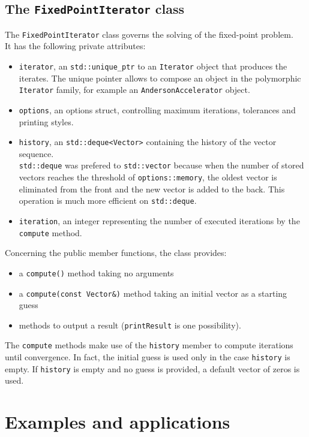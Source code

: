 \documentclass[12pt]{article}
\begin{document}
		
		\subsection {The \texttt{FixedPointIterator} class}
		The \texttt{FixedPointIterator} class governs the solving of the fixed-point problem.\\
		It has the following private attributes:
		\begin{itemize}
		\item \verb|iterator|, an \verb|std::unique_ptr| to an \verb|Iterator| object that produces the iterates. The unique pointer
		allows to compose an object in the polymorphic \verb|Iterator| family, for example an \verb|AndersonAccelerator| object.
		\item \verb|options|, an options struct, controlling maximum iterations, tolerances and printing styles.
		\item \verb|history|, an \verb|std::deque<Vector>| containing the history of the vector sequence.\\
		\verb|std::deque| was prefered to \verb|std::vector| because when the number of stored vectors reaches the threshold
		of \verb|options::memory|, the oldest vector is eliminated from the front and the new vector is added to the back.
		This operation is much more efficient on \verb|std::deque|.
		\item \verb|iteration|, an integer representing the number of executed iterations by the \verb|compute| method.
		\end{itemize}
		
		Concerning the public member functions, the class  provides:
		\begin{itemize}
		\item a \verb|compute()| method taking no arguments
		\item a \verb|compute(const Vector&)| method taking an initial vector as a starting guess
		\item  methods to output a result (\verb|printResult| is one possibility).
		\end{itemize}
		The \verb|compute| methods make use of the \verb|history| member to compute iterations until
		convergence. In fact, the initial guess is used only in the case \verb|history| is empty. If \verb|history| is empty
		and no guess is provided, a default vector of zeros is used.\\
		
		\section{Examples and applications}
			\label{sec:app}
		
\end{document}
